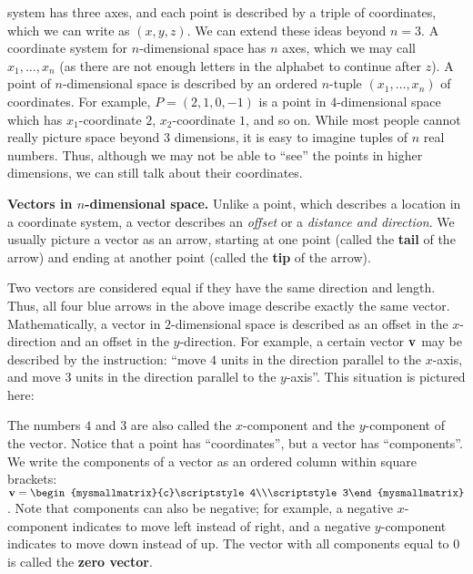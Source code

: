 system has three axes, and each point is described by a triple of
coordinates, which we can write as $(x,y,z)$.  We can extend these
ideas beyond $n=3$. A coordinate system for $n$-dimensional space has
$n$ axes, which we may call $x_1,\ldots,x_n$ (as there are not enough
letters in the alphabet to continue after $z$). A point of
$n$-dimensional space is described by an ordered $n$-tuple
$(x_1,\ldots,x_n)$ of coordinates. For example, $P=(2,1,0,-1)$ is a
point in $4$-dimensional space which has $x_1$-coordinate $2$,
$x_2$-coordinate $1$, and so on. While most people cannot really
picture space beyond $3$ dimensions, it is easy to imagine tuples of
$n$ real numbers. Thus, although we may not be able to ``see'' the
points in higher dimensions, we can still talk about their coordinates.
\bigskip

\noindent\textbf{Vectors in $n$-dimensional space.}
Unlike a point, which describes a location in a coordinate system, a
vector describes an {\em
  offset} or a {\em distance and direction}. We usually
picture a vector as an arrow, starting at one point (called the
\textbf{tail} of the arrow) and ending at another point
(called the \textbf{tip} of the arrow).
\begin{center}
\end{center}
Two vectors are considered equal if they have the same direction and
length. Thus, all four blue arrows in the above image describe exactly
the same vector. Mathematically, a vector in $2$-dimensional space is
described as an offset in the $x$-direction and an offset in the
$y$-direction.  For example, a certain vector ${\bf v}$ may be
described by the instruction: ``move $4$ units in the direction
parallel to the $x$-axis, and move $3$ units in the direction parallel
to the $y$-axis''. This situation is pictured here:
\begin{center}
\end{center}
The numbers $4$ and $3$ are also called the
$x$-component and the $y$-component of
the vector. Notice that a point has ``coordinates'', but a vector has
``components''. We write the components of a vector as an ordered
column within square brackets:
$\vect{v}=\begin{mysmallmatrix}{c}\scriptstyle4\\\scriptstyle3\end{mysmallmatrix}$. Note
that components can also be negative; for example, a negative
$x$-component indicates to move left instead of right, and a negative
$y$-component indicates to move down instead of up. The vector with
all components equal to $0$ is called the \textbf{zero
  vector}. 

